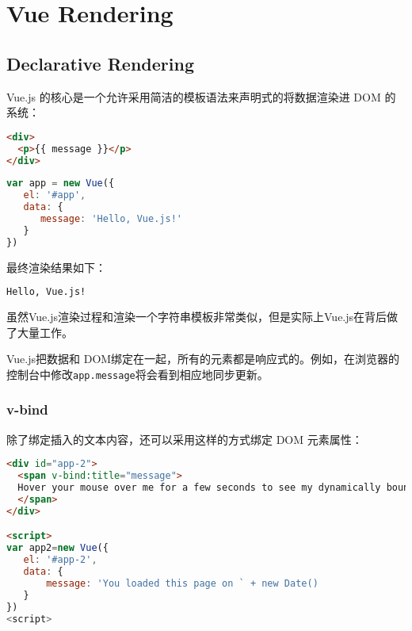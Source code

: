 \begin{lstlisting}[language=JavaScript]

\end{lstlisting}





\chapter{Vue Rendering}



\section{Declarative Rendering}



Vue.js 的核心是一个允许采用简洁的模板语法来声明式的将数据渲染进 DOM 的系统：


\begin{lstlisting}[language=HTML]
<div>
  <p>{{ message }}</p>
</div>
\end{lstlisting}



\begin{lstlisting}[language=JavaScript]
var app = new Vue({
   el: '#app',
   data: {
      message: 'Hello, Vue.js!'
   }
})
\end{lstlisting}


最终渲染结果如下：

\begin{lstlisting}[language=HTML]
Hello, Vue.js!
\end{lstlisting}


虽然Vue.js渲染过程和渲染一个字符串模板非常类似，但是实际上Vue.js在背后做了大量工作。

Vue.js把数据和 DOM绑定在一起，所有的元素都是响应式的。例如，在浏览器的控制台中修改\texttt{app.message}将会看到相应地同步更新。

\subsection{v-bind}


除了绑定插入的文本内容，还可以采用这样的方式绑定 DOM 元素属性：


\begin{lstlisting}[language=HTML]
<div id="app-2">
  <span v-bind:title="message">
  Hover your mouse over me for a few seconds to see my dynamically bound title!
  </span>
</div>

<script>
var app2=new Vue({
   el: '#app-2',
   data: {
       message: 'You loaded this page on ` + new Date()
   }
})
<script>
\end{lstlisting}


